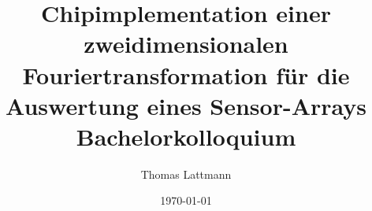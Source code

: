 

\title[Chipimplementation einer 2D-DFT für die Auswertung eines Sensor-Arrays]{\LARGE{Chipimplementation einer zweidimensionalen Fouriertransformation für die Auswertung eines Sensor-Arrays}\\ 
\medskip \medskip \medskip \medskip \medskip  \large{Bachelorkolloquium}\\
\medskip }  

\author[TL]{Thomas Lattmann}
\date[\today]{\today} 



\begin{frame}[plain]
 	\titlepage
\end{frame}



